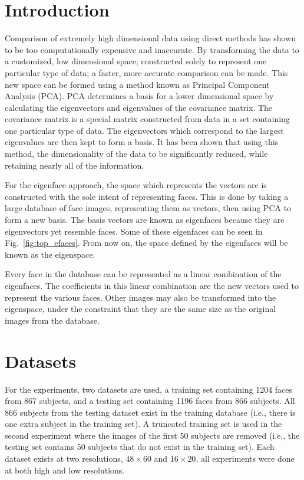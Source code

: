 
\section{Introduction}

  Comparison of extremely high dimensional data using direct methods has shown to be
  too computationally expensive and inaccurate.  By transforming the data to a
  customized, low dimensional space; constructed solely to represent one particular
  type of data; a faster, more accurate comparison can be made.  This new space can
  be formed using a method known as Principal Component Analysis (PCA).  PCA determines
  a basis for a lower dimensional space by calculating the eigenvectors and eigenvalues
  of the covariance matrix. The covariance matrix is a special matrix constructed
  from data in a set containing one particular type of data. The eigenvectors which
  correspond to the largest eigenvalues are then kept to form a basis. It has been shown
  that using this method, the dimensionality of the data to be significantly reduced,
  while retaining nearly all of the information.

  For the eigenface approach, the space which represents the vectors are is constructed with
  the sole intent of representing faces.  This is done by taking a large database of face
  images, representing them as vectors, then using PCA to form a new basis.  The basis
  vectors are known as eigenfaces because they are eigenvectors yet resemble faces.  Some
  of these eigenfaces can be seen in Fig.~\ref{fig:top_efaces}.  From now on, the space
  defined by the eigenfaces will be known as the eigenspace.

  Every face in the database can be represented as a linear combination of the eigenfaces.
  The coefficients in this linear combination are the new vectors used to represent the
  various faces.  Other images may also be transformed into the eigenspace, under the
  constraint that they are the same size as the original images from the database.

\section{Datasets}

  For the experiments, two datasets are used, a training set containing 1204 faces from 867
  subjects, and a testing set containing 1196 faces from 866 subjects. All 866 subjects
  from the testing dataset exist in the training database (i.e., there is one extra
  subject in the training set).  A truncated training set is used in the second experiment
  where the images of the first 50 subjects are removed (i.e., the testing set contains
  50 subjects that do not exist in the training set).  Each dataset exists at two
  resolutions, $48 \times 60$ and $16 \times 20$, all experiments were done at both high
  and low resolutions.
  
